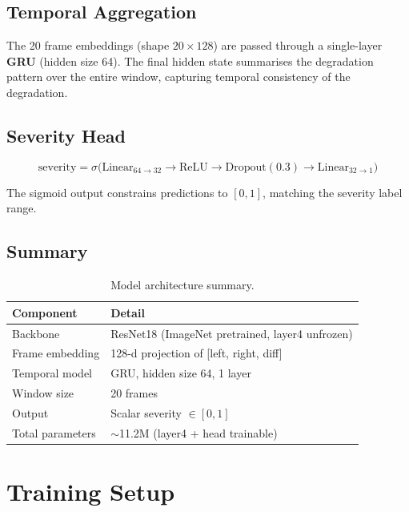 \documentclass[11pt, a4paper]{article}
\begin{document}
\subsection{Temporal Aggregation}
The 20 frame embeddings (shape $20 \times 128$) are passed through a single-layer
\textbf{GRU} (hidden size 64). The final hidden state summarises the degradation
pattern over the entire window, capturing temporal consistency of the degradation.

\subsection{Severity Head}
$$\text{severity} = \sigma\bigl(\text{Linear}_{64 \to 32} \to \text{ReLU} \to \text{Dropout}(0.3) \to \text{Linear}_{32 \to 1}\bigr)$$

The sigmoid output constrains predictions to $[0, 1]$, matching the severity
label range.

\subsection{Summary}

\begin{table}[H]
\centering
\begin{tabular}{ll}
\toprule
\textbf{Component}     & \textbf{Detail} \\
\midrule
Backbone               & ResNet18 (ImageNet pretrained, layer4 unfrozen) \\
Frame embedding        & 128-d projection of [left, right, diff] \\
Temporal model         & GRU, hidden size 64, 1 layer \\
Window size            & 20 frames \\
Output                 & Scalar severity $\in [0, 1]$ \\
Total parameters       & $\sim$11.2M  (layer4 + head trainable) \\
\bottomrule
\end{tabular}
\caption{Model architecture summary.}
\end{table}

\section{Training Setup}
\end{document}
